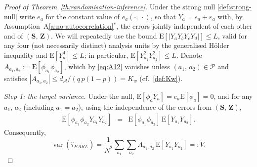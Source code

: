 \documentclass[sigconf]{acmart}
\newcommand{\E}{\mathrm E}
\DeclareMathOperator{\var}{var}
\begin{document}
\begin{proof}[Proof of Theorem~\ref{th:randomisation-inference}]
    Under the strong null \eqref{def:strong-null} write $e_a$ for the constant value of $e_a(\cdot,\,\cdot)$, so that $Y_a = e_a + \varepsilon_a$ with, by Assumption~A\ref{a:no-autocorrelation}$^*$, the errors jointly independent of each other and of $(\mathbf S,\,\mathbf Z)$. We will repeatedly use the bound $\E[|Y_{a}Y_{b}Y_{c}Y_{d}|]\le L$, valid for any four (not necessarily distinct) analysis units by the generalised H\"older inequality and $\E[Y_a^4]\le L$; in particular, $\E[Y_{a_1}^2Y_{a_2}^2]\le L$. Denote $A_{a_1,a_2} := \E[\phi_{a_1}\phi_{a_2}]$, which by \eqref{eq:A12} vanishes unless $(a_1,\,a_2)\in\mathcal P$ and satisfies $|A_{a_1,a_2}|\le d_{\mathcal A}/(q\,p(1-p)) = K_w$ (cf.~\eqref{def:Kw}).

    \emph{Step 1: the target variance.} Under the null, $\E[\phi_aY_a] = e_a\E[\phi_a] = 0$, and for any $a_1,\,a_2$ (including $a_1=a_2$), using the independence of the errors from $(\mathbf S,\,\mathbf Z)$,
    \begin{eqnarray*}
        \E[\phi_{a_1}\phi_{a_2}Y_{a_1}Y_{a_2}] &=& \E[\phi_{a_1}\phi_{a_2}]\,\E[Y_{a_1}Y_{a_2}].
    \end{eqnarray*}
    Consequently,
    \begin{equation}\label{eq:var-null}
        \var(\hat\tau^{\phantom{1}}_{EARL}) = \frac 1{N^2}\sum_{a_1}\sum_{a_2}A_{a_1,a_2}\,\E[Y_{a_1}Y_{a_2}] =: \tilde V.
    \end{equation}


\end{proof}
\end{document}

